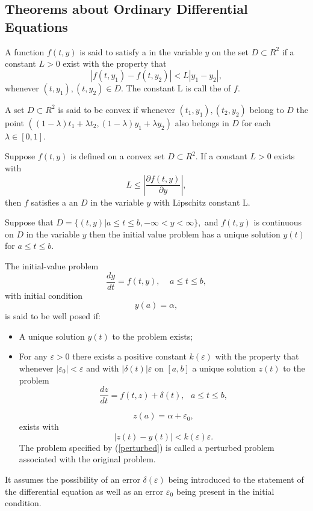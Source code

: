 \subsection{Theorems about Ordinary Differential Equations}
\begin{definition}
A function $f(t,y)$ is said to satisfy a \textbf{} in the variable $y$ on 
the set $D \subset R^2$ if a constant $L>0$ exist with the property that
\[|f(t,y_1)-f(t,y_2)| < L|y_1-y_2|, \]
whenever $(t,y_1),(t,y_2) \in D$.  The constant L is call the 
of $f$.
\end{definition}
\begin{definition}
A set $D\subset R^2$ is said to be convex if whenever $(t_1,y_1),(t_2,y_2)$ belong
to $D$ the point $((1-\lambda)t_1+\lambda t_2, (1-\lambda)y_1+\lambda y_2)$ also
belongs in $D$ for each $\lambda \in [0,1]$.
\end{definition}
\begin{theorem}
Suppose $f(t,y)$ is defined on a convex set $D \subset R^2$. If a constant
$L>0$ exists with
\[L\leq \left|\frac{\partial f(t,y)}{\partial y}\right|, \]
then $f$ satisfies a  an $D$ in the variable $y$ with
Lipschitz constant L.
\end{theorem}
\begin{theorem}
Suppose that
$D= \{(t,y) | a\leq t \leq b, -\infty <y < \infty \},$
and $f(t,y)$ is continuous on $D$ in the variable $y$ then the initial value
problem has a unique solution $y(t)$ for $a\leq t \leq b$.
\end{theorem}
\begin{definition}
The initial-value problem 
\[\frac{dy}{dt}=f(t,y), \ \ \ \ \  a\leq t \leq b,\]
with initial condition
\[y(a) = \alpha, \]
is said to be well posed if:
\begin{itemize}
\item
A unique solution $y(t)$ to the problem exists;
\item
For any $\varepsilon >0$ there exists a positive constant $k(\varepsilon)$
with the property that whenever $|\varepsilon_0| < \varepsilon$ and with
$|\delta(t)| \varepsilon$ on $[a,b]$ a unique solution $z(t)$ to the problem
\begin{equation} 
\label{perturbed}
\frac{dz}{dt}=f(t,z)+\delta(t), \ \ \  a\leq t \leq b, \end{equation}

\[z(a)=\alpha +\varepsilon_0, \]
exists with
\[ |z(t) - y(t) | < k(\varepsilon)\varepsilon. \]
The problem specified by (\ref{perturbed}) is called a perturbed problem associated
with the original problem.
\end{itemize}
It assumes the possibility of an error $\delta(\varepsilon)$ being introduced to
the statement of the differential equation as well as an error $\varepsilon_0$
being present in the initial condition.

\end{definition}
